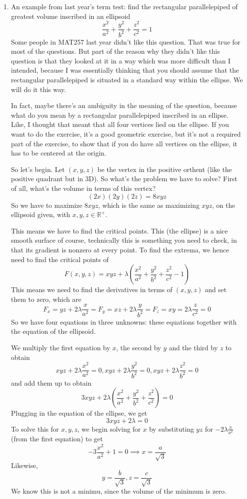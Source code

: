 \documentclass{article}
\newcommand{\reals}[0]{\mathbb{R}}
\begin{document}
\begin{enumerate}
  \item An example from last year's term test: find the rectangular parallelepiped of greatest volume inscribed in an ellipsoid
  \[\frac{x^2}{a^2} + \frac{y^2}{b^2} + \frac{z^2}{c^2} = 1\]
  Some people in MAT257 last year didn't like this question. That was true for most of the questions. But part of the reason why they didn't like this question is that they looked at it in a way which was more difficult than I intended, because I was essentially thinking that you should assume that the rectangular parallelepiped is situated in a standard way within the ellipse. We will do it this way.

  In fact, maybe there's an ambiguity in the meaning of the question, because what do you mean by a rectangular parallelepiped inscribed in an ellipse. Like, I thought that meant that all four vertices lied on the ellipse. If you want to do the exercise, it's a good geometric exercise, but it's not a required part of the exercise, to show that if you do have all vertices on the ellipse, it has to be centered at the origin.

  So let's begin. Let \((x, y, z)\) be the vertex in the positive orthent (like the positive quadrant but in 3D). So what's the problem we have to solve? First of all, what's the volume in terms of this vertex?
  \[(2x)(2y)(2z) = 8xyz\]
  So we have to maximize \(8xyz\), which is the same as maximizing \(xyz\), on the ellipsoid  given, with \(x, y, z \in \reals^+\).

  This means we have to find the critical points. This (the ellipse) is a nice smooth surface of course, technically this is something you need to check, in that its gradient is nonzero at every point. To find the extrema, we hence need to find the critical points of
  \[F(x, y, z) = xyz + \lambda\left(\frac{x^2}{a^2} + \frac{y^2}{b^2} + \frac{z^2}{c^2} - 1\right)\]
  This means we need to find the derivatives in terms of \((x, y, z)\) and set them to zero, which are
  \[F_x = yz + 2\lambda\frac{x}{a^2} = F_y = xz + 2\lambda\frac{y}{b^2} = F_z = xy = 2\lambda\frac{z}{c^2} = 0\]
  So we have four equations in three unknowns: these equations together with the equation of the ellipsoid.

  We multiply the first equation by \(x\), the second by \(y\) and the third by \(z\) to obtain
  \[xyz + 2\lambda\frac{x^2}{a^2} = 0, xyz + 2\lambda\frac{y^2}{b^2} = 0, xyz + 2\lambda\frac{z^2}{b^2} = 0\]
  and add them up to obtain
  \[3xyz + 2\lambda\left(\frac{x^2}{a^2} + \frac{y^2}{b^2} + \frac{z^2}{c^2}\right) = 0\]
  Plugging in the equation of the ellipse, we get
  \[3xyz + 2\lambda = 0\]
  To solve this for \(x, y, z\), we begin solving for \(x\) by substituting \(yz\) for \(-2\lambda\frac{x}{a^2}\) (from the first equation) to get
  \[-3\frac{x^2}{a^2} + 1 = 0 \implies x = \frac{a}{\sqrt{3}}\]
  Likewise,
  \[y = \frac{b}{\sqrt{3}}, z = \frac{c}{\sqrt{3}}\]
  We know this is not a minimu, since the volume of the minimum is zero.

\end{enumerate}
\end{document}
